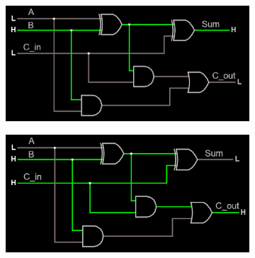 \documentclass{article}
\begin{document}
\begin{figure}[H]
		\begin{subfigure}[b]{0.4\textwidth}
			\centering
			\includegraphics[width=\textwidth]{full_adder/full_adder_010.png}
		\end{subfigure}
		\begin{subfigure}[b]{0.4\textwidth}
			\includegraphics[width=\textwidth]{full_adder/full_adder_011.png}
		\end{subfigure}
		

\end{figure}
\end{document}
